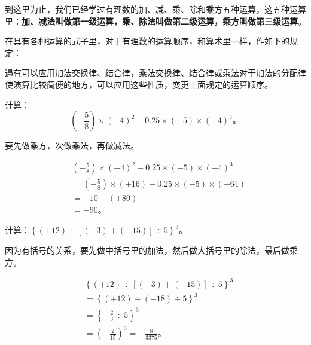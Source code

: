 到这里为止，我们已经学过有理数的加、减、乘、除和乘方五种运算，这五种运算里：\textbf{加、减法叫做第一级运算，乘、除法叫做第二级运算，乘方叫做第三级运算}。

在具有各种运算的式子里，对于有理数的运算顺序，和算术里一样，作如下的规定：

\begin{center}
\end{center}

遇有可以应用加法交换律、结合律，乘法交换律、结合律或乘法对于加法的分配律使演算比较简便的地方，可以应用这些性质，变更上面规定的运算顺序。

 计算：
\[
\left(-\frac{5}{8}\right) \times (-4)^2 - 0.25 \times (-5) \times (-4)^3。
\]

 要先做乘方，次做乘法，再做减法。

\begin{align*}
&\left(-\frac{5}{8}\right) \times (-4)^2 - 0.25 \times (-5) \times (-4)^3 \\
&= \left(-\frac{5}{8}\right) \times (+16) - 0.25 \times (-5) \times (-64) \\
&= -10 - (+80) \\
&= -90。
\end{align*}

 计算：\(\left\{(+12) \div [(-3) + (-15)] \div 5\right\}^3\)。

 因为有括号的关系，要先做中括号里的加法，然后做大括号里的除法，最后做乘方。

\begin{align*}
&\left\{(+12) \div [(-3) + (-15)] \div 5\right\}^3 \\
&= \left\{(+12) \div (-18) \div 5\right\}^3 \\
&= \left\{-\frac{2}{3} \div 5\right\}^3 \\
&= \left(-\frac{2}{15}\right)^3 = -\frac{8}{3375}。
\end{align*}


